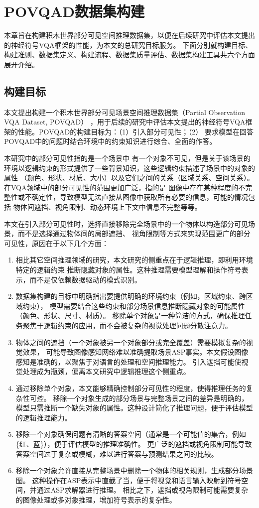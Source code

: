 \chapter{POVQAD数据集构建}
\label{dataset}
本章旨在构建积木世界部分可见空间推理数据集，以便在后续研究中评估本文提出的神经符号VQA框架的性能，为本文的总研究目标服务。
下面分别就构建目标、构建准则、数据集定义、构建流程、数据集质量评估、数据集构建工具共六个方面展开介绍。
\section{构建目标}
本文提出构建一个积木世界部分可见场景空间推理数据集（Partial Observation VQA Data\-set, POVQAD）
，用于后续的研究中评估本文提出的神经符号VQA框架的性能。POVQAD的构建目标为：（1）引入部分可见性；（2）
要求模型在回答POVQAD中的问题时结合环境中的约束知识进行综合、全面的作答。

本研究中的部分可见性指的是一个场景中
有一个对象不可见，但是关于该场景的环境以逻辑约束的形式提供了一些背景知识，这些逻辑约束描述了场景中的对象的属性
（颜色、形状、材质、大小）以及它们之间的关系（区域关系、空间关系）。在VQA领域中的部分可见性的范围更加广泛，指的是
图像中存在某种程度的不完整性或不确定性，导致模型无法直接从图像中获取所有必要的信息，可能的情况包括
物体间遮挡、视角限制、动态环境上下文中信息不完整等等。

本文在引入部分可见性时，选择直接移除完全场景中的一个物体以构造部分可见场景，而不是选择通过物体间的局部遮挡、
视角限制等方式来实现范围更广的部分可见性，原因在于以下几个方面：
\begin{enumerate}[nosep]
\item 相比其它空间推理领域的研究，本文研究的侧重点在于逻辑推理，即利用环境特定的逻辑约束
推断隐藏对象的属性。这种推理需要模型理解和操作符号表示，而不是仅依赖数据驱动的模式识别。
\item 数据集构建的目标中明确指出要提供明确的环境约束（例如，区域约束、跨区域约束），
模型需要结合这些约束和部分场景信息推断隐藏对象的可能属性（颜色、形状、尺寸、材质）。
移除单个对象是一种简洁的方式，确保推理任务聚焦于逻辑约束的应用，而不会被复杂的视觉处理问题分散注意力。
\item 物体之间的遮挡（一个对象被另一个对象部分或完全覆盖）需要模拟复杂的视觉效果，
可能导致图像感知网络难以准确提取场景ASP事实。本文假设图像感知是准确的，以聚焦于对语言的处理和空间推理能力。
引入遮挡可能使视觉处理成为瓶颈，偏离本文研究中逻辑推理这个侧重点。
\item 通过移除单个对象，本文能够精确控制部分可见性的程度，使得推理任务的复杂性可控。
移除一个对象生成的部分场景与完整场景之间的差异是明确的，模型只需推断一个缺失对象的属性。这种设计简化了推理问题，便于评估模型的逻辑推理能力。
\item 移除一个对象确保问题有清晰的答案空间（通常是一个可能值的集合，例如\{红、蓝\}），便于评估模型的推理准确性。
更广泛的遮挡或视角限制可能导致答案空间过于复杂或模糊，难以进行答案与预测结果之间的比较。
\item 移除一个对象允许直接从完整场景中删除一个物体的相关规则，生成部分场景图。
这种操作在ASP表示中直截了当，便于将视觉和语言输入映射到符号空间，并通过ASP求解器进行推理。
相比之下，遮挡或视角限制可能需要复杂的图像处理或多对象推理，增加符号表示的复杂性。
\end{enumerate}

